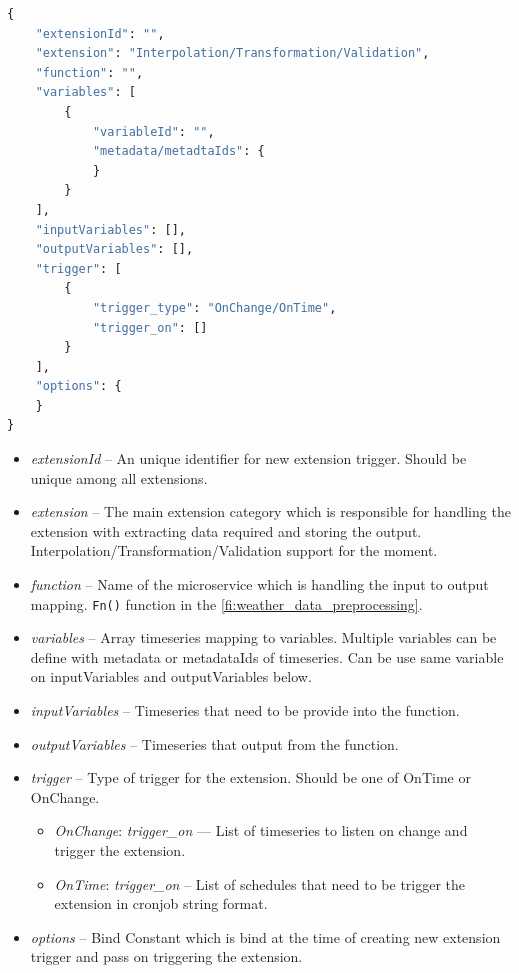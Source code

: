 \begin{lstlisting}[language=Python]
{
    "extensionId": "",
    "extension": "Interpolation/Transformation/Validation",
    "function": "",
    "variables": [
        {
            "variableId": "",
            "metadata/metadtaIds": {
            }
        }
    ],
    "inputVariables": [],
    "outputVariables": [],
    "trigger": [
        {
            "trigger_type": "OnChange/OnTime",
            "trigger_on": []
        }
    ],
    "options": {
    }
}
\end{lstlisting}
\begin{itemize}
    \item \emph{extensionId} -- An unique identifier for new extension trigger. Should be unique among all extensions.
    \item \emph{extension} -- The main extension category which is responsible for handling the extension with extracting data required and storing the output. Interpolation/Transformation/Validation support for the moment.
    \item \emph{function} -- Name of the microservice which is handling the input to output mapping. \texttt{Fn()} function in the \cref{fi:weather_data_preprocessing}.
    \item \emph{variables} -- Array timeseries mapping to variables. Multiple variables can be define with metadata or metadataIds of timeseries. Can be use same variable on inputVariables and outputVariables below.
    \item \emph{inputVariables} -- Timeseries that need to be provide into the function.
    \item \emph{outputVariables} -- Timeseries that output from the function.
    \item \emph{trigger} -- Type of trigger for the extension. Should be one of OnTime or OnChange.
        \begin{itemize}
            \item \emph{OnChange}: \textit{trigger\_on} --- List of timeseries to listen on change and trigger the extension.
            \item \emph{OnTime}: \textit{trigger\_on} -- List of schedules that need to be trigger the extension in cronjob string format.
        \end{itemize}
    \item \emph{options} -- Bind Constant which is bind at the time of creating new extension trigger and pass on triggering the extension.
\end{itemize}

